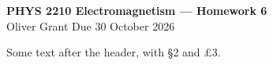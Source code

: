 \documentclass[11pt]{article}
\begin{document}
\begin{center}
\textbf{\large PHYS 2210 Electromagnetism --- Homework 6}\\
Oliver Grant \quad\textbullet\quad Due 30 October 2026
\end{center}
Some text after the header, with \S 2 and \pounds 3.
\end{document}

